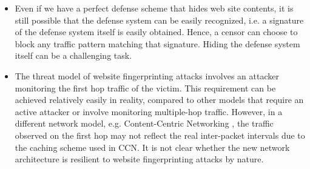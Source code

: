 \documentclass[11pt,oneside]{article}
\begin{document}
\begin{itemize}

\item
Even if we have a perfect defense scheme that hides web site contents, it is
still possible that the defense system can be easily recognized, i.e. a signature
of the defense system itself is easily obtained. Hence, a censor can choose to
block any traffic pattern matching that signature. Hiding the defense system
itself can be a challenging task.

\item
The threat model of website fingerprinting attacks involves an attacker
monitoring the first hop traffic of the victim. This requirement can be
achieved relatively easily in reality, compared to other models that require an
active attacker or involve monitoring multiple-hop traffic. However, in a
different network model, e.g. Content-Centric Networking
\cite{jacobson-CoNEXT09}, the traffic observed on the first hop may not reflect
the real inter-packet intervals due to the caching scheme used in CCN. It is
not clear whether the new network architecture is resilient to website
fingerprinting attacks by nature.

\end{itemize} 



\end{document}
